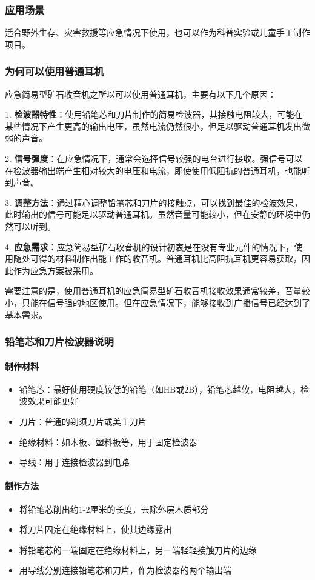 \documentclass[12pt,UTF8]{ctexbook}
\begin{document}
\subsubsection{应用场景}
适合野外生存、灾害救援等应急情况下使用，也可以作为科普实验或儿童手工制作项目。

\subsubsection{为何可以使用普通耳机}
应急简易型矿石收音机之所以可以使用普通耳机，主要有以下几个原因：

1. \textbf{检波器特性}：使用铅笔芯和刀片制作的简易检波器，其接触电阻较大，可能在某些情况下产生更高的输出电压，虽然电流仍然很小，但足以驱动普通耳机发出微弱的声音。

2. \textbf{信号强度}：在应急情况下，通常会选择信号较强的电台进行接收。强信号可以在检波器输出端产生相对较大的电压和电流，即使使用低阻抗的普通耳机，也能听到声音。

3. \textbf{调整方法}：通过精心调整铅笔芯和刀片的接触点，可以找到最佳的检波效果，此时输出的信号可能足以驱动普通耳机。虽然音量可能较小，但在安静的环境中仍然可以听到。

4. \textbf{应急需求}：应急简易型矿石收音机的设计初衷是在没有专业元件的情况下，使用随处可得的材料制作出能工作的收音机。普通耳机比高阻抗耳机更容易获取，因此作为应急方案被采用。

需要注意的是，使用普通耳机的应急简易型矿石收音机接收效果通常较差，音量较小，只能在信号强的地区使用。但在应急情况下，能够接收到广播信号已经达到了基本需求。

\subsubsection{铅笔芯和刀片检波器说明}

\paragraph{制作材料}
\begin{itemize}
  \item 铅笔芯：最好使用硬度较低的铅笔（如HB或2B），铅笔芯越软，电阻越大，检波效果可能更好
  \item 刀片：普通的剃须刀片或美工刀片
  \item 绝缘材料：如木板、塑料板等，用于固定检波器
  \item 导线：用于连接检波器到电路
\end{itemize}

\paragraph{制作方法}
\begin{itemize}
  \item 将铅笔芯削出约1-2厘米的长度，去除外层木质部分
  \item 将刀片固定在绝缘材料上，使其边缘露出
  \item 将铅笔芯的一端固定在绝缘材料上，另一端轻轻接触刀片的边缘
  \item 用导线分别连接铅笔芯和刀片，作为检波器的两个输出端
\end{itemize}
\end{document}

